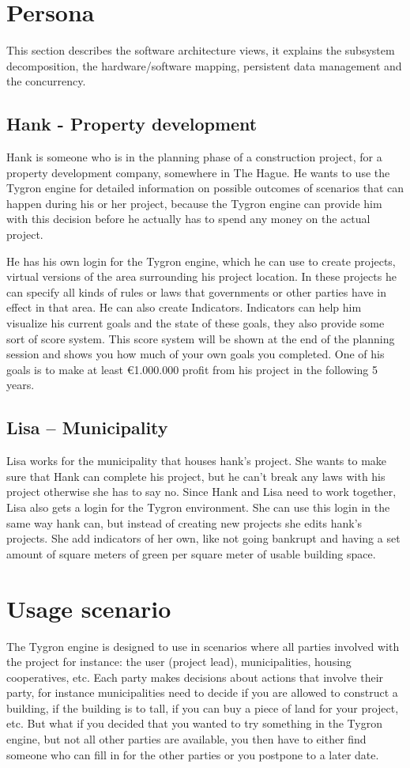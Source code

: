 \section{Persona}
This section describes the software architecture views, it explains the subsystem decomposition, the hardware/software mapping, persistent data management and the concurrency.
\subsection*{Hank - Property development}
Hank is someone who is in the planning phase of a construction project, for a property development company, somewhere in The Hague. He wants to use the Tygron engine for detailed information on possible outcomes of scenarios that can happen during his or her project, because the Tygron engine can provide him with this decision before he actually has to spend any money on the actual project. 

He has his own login for the Tygron engine, which he can use to create projects, virtual versions of the area surrounding his project location. In these projects he can specify all kinds of rules or laws that governments or other parties have in effect in that area. He can also create Indicators. Indicators can help him visualize his current goals and the state of these goals, they also provide some sort of score system. This score system will be shown at the end of the planning session and shows you how much of your own goals you completed. One of his goals is to make at least €1.000.000 profit from his project in the following 5 years.

\subsection*{Lisa – Municipality}
Lisa works for the municipality that houses hank’s project. She wants to make sure that Hank can complete his project, but he can’t break any laws with his project otherwise she has to say no. Since Hank and Lisa need to work together, Lisa also gets a login for the Tygron environment. She can use this login in the same way hank can, but instead of creating new projects she edits hank’s projects. She add indicators of her own, like not going bankrupt and having a set amount of square meters of green per square meter of usable building space.

\newpage
\section{Usage scenario}
The Tygron engine is designed to use in scenarios where all parties involved with the project for instance: the user (project lead), municipalities, housing cooperatives, etc. Each party makes decisions about actions that involve their party, for instance municipalities need to decide if you are allowed to construct a building, if the building is to tall, if you can buy a piece of land for your project, etc. But what if you decided that you wanted to try something in the Tygron engine, but not all other parties are available, you then have to either find someone who can fill in for the other parties or you postpone to a later date.

